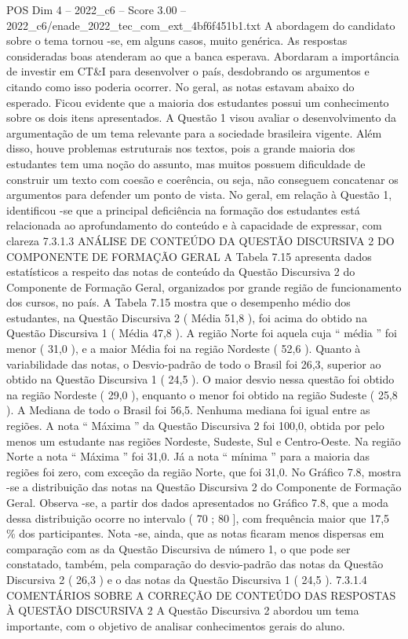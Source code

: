 \begin{textsample}{POS Dim 4 – 2022\_c6 – Score 3.00 – 2022\_c6/enade\_2022\_tec\_com\_ext\_4bf6f451b1.txt}
A abordagem do candidato sobre o tema tornou -se, em alguns casos, muito genérica.
As respostas consideradas boas atenderam ao que a banca esperava.
Abordaram a importância de investir em CT\&I para desenvolver o país, desdobrando os argumentos e citando como isso poderia ocorrer.
No geral, as notas estavam abaixo do esperado.
Ficou evidente que a maioria dos estudantes possui um conhecimento sobre os dois itens apresentados.
A Questão 1 visou avaliar o desenvolvimento da argumentação de um tema relevante para a sociedade brasileira vigente.
Além disso, houve problemas estruturais nos textos, pois a grande maioria dos estudantes tem uma noção do assunto, mas muitos possuem dificuldade de construir um texto com coesão e coerência, ou seja, não conseguem concatenar os argumentos para defender um ponto de vista.
No geral, em relação à Questão 1, identificou -se que a principal deficiência na formação dos estudantes está relacionada ao aprofundamento do conteúdo e à capacidade de expressar, com clareza 7.3.1.3 ANÁLISE DE CONTEÚDO DA QUESTÃO DISCURSIVA 2 DO COMPONENTE DE FORMAÇÃO GERAL A Tabela 7.15 apresenta dados estatísticos a respeito das notas de conteúdo da Questão Discursiva 2 do Componente de Formação Geral, organizados por grande região de funcionamento dos cursos, no país.
A Tabela 7.15 mostra que o desempenho médio dos estudantes, na Questão Discursiva 2 ( Média 51,8 ), foi acima do obtido na Questão Discursiva 1 ( Média 47,8 ).
A região Norte foi aquela cuja “ média ” foi menor ( 31,0 ), e a maior Média foi na região Nordeste ( 52,6 ).
Quanto à variabilidade das notas, o Desvio-padrão de todo o Brasil foi 26,3, superior ao obtido na Questão Discursiva 1 ( 24,5 ).
O maior desvio nessa questão foi obtido na região Nordeste ( 29,0 ), enquanto o menor foi obtido na região Sudeste ( 25,8 ).
A Mediana de todo o Brasil foi 56,5.
Nenhuma mediana foi igual entre as regiões.
A nota “ Máxima ” da Questão Discursiva 2 foi 100,0, obtida por pelo menos um estudante nas regiões Nordeste, Sudeste, Sul e Centro-Oeste.
Na região Norte a nota “ Máxima ” foi 31,0.
Já a nota “ mínima ” para a maioria das regiões foi zero, com exceção da região Norte, que foi 31,0.
No Gráfico 7.8, mostra -se a distribuição das notas na Questão Discursiva 2 do Componente de Formação Geral.
Observa -se, a partir dos dados apresentados no Gráfico 7.8, que a moda dessa distribuição ocorre no intervalo ( 70 ; 80 ], com frequência maior que 17,5 \% dos participantes.
Nota -se, ainda, que as notas ficaram menos dispersas em comparação com as da Questão Discursiva de número 1, o que pode ser constatado, também, pela comparação do desvio-padrão das notas da Questão Discursiva 2 ( 26,3 ) e o das notas da Questão Discursiva 1 ( 24,5 ). 7.3.1.4 COMENTÁRIOS SOBRE A CORREÇÃO DE CONTEÚDO DAS RESPOSTAS À QUESTÃO DISCURSIVA 2 A Questão Discursiva 2 abordou um tema importante, com o objetivo de analisar conhecimentos gerais do aluno.

\end{textsample}
